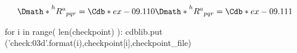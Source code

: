 \documentclass[12pt]{cdblatex}
\begin{document}
\begin{dgroup*}[spread={3pt}]
   \Dmath*{{\strut}^hR^{a}{}_{pqr} = \Cdb*{ex-09.110}}
   \Dmath*{{\strut}^hR^{a}{}_{pqr} = \Cdb*{ex-09.111}}
\end{dgroup*}

\clearpage


\bgroup
{}
\begin{cadabra}
   for i in range( len(checkpoint) ):
      cdblib.put ('check{:03d}'.format(i),checkpoint[i],checkpoint_file)
\end{cadabra}
\egroup
\end{document}
